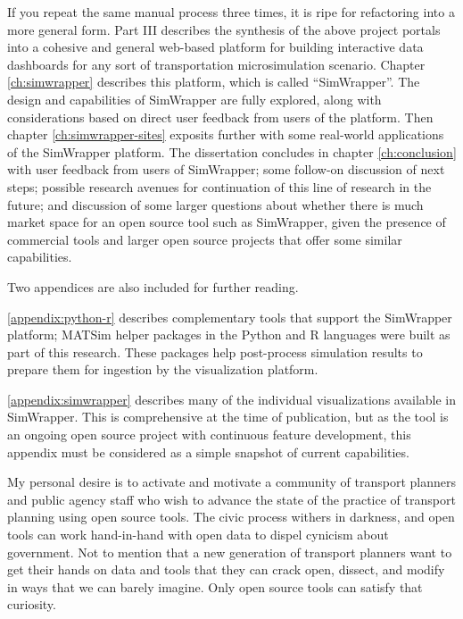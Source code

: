 If you repeat the same manual process three times, it is ripe for refactoring into a more general form. Part III describes the synthesis of the above project portals into a cohesive and general web-based platform for building interactive data dashboards for any sort of transportation microsimulation scenario. Chapter \ref{ch:simwrapper} describes this platform, which is called ``SimWrapper''. The design and capabilities of SimWrapper are fully explored, along with considerations based on direct user feedback from users of the platform. Then chapter \ref{ch:simwrapper-sites} exposits further with some real-world applications of the SimWrapper platform. The dissertation concludes in chapter \ref{ch:conclusion} with user feedback from users of SimWrapper; some follow-on discussion of next steps; possible research avenues for continuation of this line of research in the future; and discussion of some larger questions about whether there is much market space for an open source tool such as SimWrapper, given the presence of commercial tools and larger open source projects that offer some similar capabilities.

Two appendices are also included for further reading.

\autoref{appendix:python-r} describes complementary tools that support the SimWrapper platform; MATSim helper packages in the Python and R languages were built as part of this research. These packages help post-process simulation results to prepare them for ingestion by the visualization platform.

\autoref{appendix:simwrapper} describes many of the individual visualizations available in SimWrapper. This is comprehensive at the time of publication, but as the tool is an ongoing open source project with continuous feature development, this appendix must be considered as a simple snapshot of current capabilities.

My personal desire is to activate and motivate a community of transport planners and public agency staff who wish to advance the state of the practice of transport planning using open source tools. The civic process withers in darkness, and open tools can work hand-in-hand with open data to dispel cynicism about government. Not to mention that a new generation of transport planners want to get their hands on data and tools that they can crack open, dissect, and modify in ways that we can barely imagine. Only open source tools can satisfy that curiosity.
